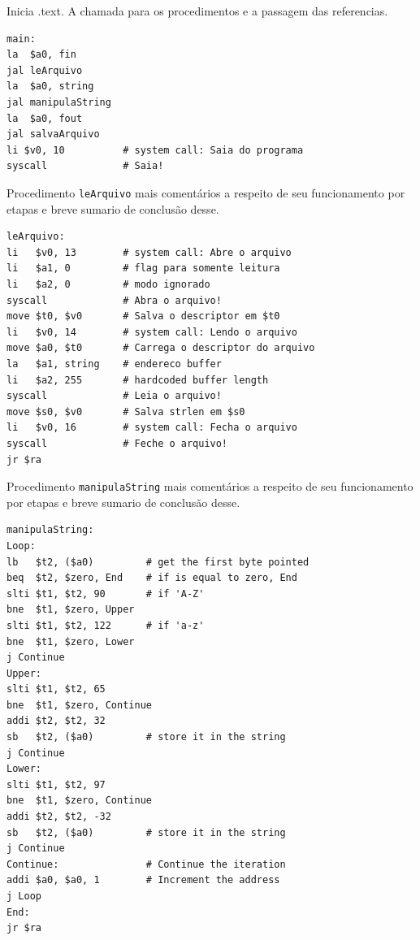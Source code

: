 \documentclass[12pt,a4paper]{article}
\numberwithin{figure}{section}
\begin{document}
Inicia .text. A chamada para os procedimentos e a passagem das referencias.

\vspace{-0.5cm}
\begin{lstlisting}[caption={main}]
main:
la  $a0, fin
jal leArquivo
la  $a0, string
jal manipulaString
la  $a0, fout
jal salvaArquivo
li $v0, 10          # system call: Saia do programa
syscall             # Saia!
\end{lstlisting}

Procedimento \texttt{leArquivo} mais comentários a respeito de seu funcionamento por etapas e breve sumario de conclusão desse.

\vspace{-0.5cm}
\begin{lstlisting}[caption={leArquivo}]
leArquivo:
li   $v0, 13        # system call: Abre o arquivo
li   $a1, 0         # flag para somente leitura
li   $a2, 0         # modo ignorado
syscall             # Abra o arquivo!
move $t0, $v0       # Salva o descriptor em $t0
li   $v0, 14        # system call: Lendo o arquivo
move $a0, $t0       # Carrega o descriptor do arquivo
la   $a1, string    # endereco buffer
li   $a2, 255       # hardcoded buffer length
syscall             # Leia o arquivo!
move $s0, $v0       # Salva strlen em $s0
li   $v0, 16        # system call: Fecha o arquivo
syscall             # Feche o arquivo!
jr $ra
\end{lstlisting}


Procedimento \texttt{manipulaString} mais comentários a respeito de seu funcionamento por etapas e breve sumario de conclusão desse.

\lipsum[1]

\vspace{-0.5cm}
\begin{lstlisting}[caption={manipulaString}]
manipulaString:
Loop:  
lb   $t2, ($a0)         # get the first byte pointed
beq  $t2, $zero, End    # if is equal to zero, End
slti $t1, $t2, 90       # if 'A-Z'
bne  $t1, $zero, Upper
slti $t1, $t2, 122      # if 'a-z'
bne  $t1, $zero, Lower
j Continue
Upper:
slti $t1, $t2, 65
bne  $t1, $zero, Continue
addi $t2, $t2, 32  
sb   $t2, ($a0)         # store it in the string
j Continue
Lower:
slti $t1, $t2, 97
bne  $t1, $zero, Continue
addi $t2, $t2, -32  
sb   $t2, ($a0)         # store it in the string
j Continue
Continue:               # Continue the iteration
addi $a0, $a0, 1        # Increment the address
j Loop
End:    
jr $ra
\end{lstlisting}
\end{document}
